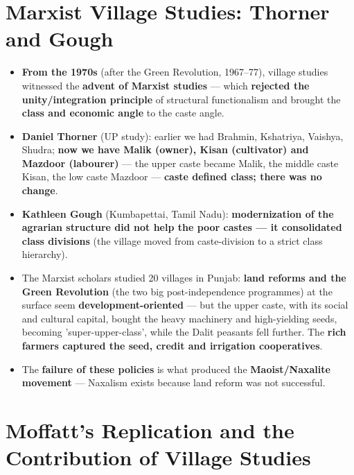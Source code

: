 \section{Marxist Village Studies: Thorner and Gough}

\begin{KeyConcept}
\begin{itemize}
\item \textbf{From the 1970s} (after the Green Revolution, 1967--77), village studies witnessed the \textbf{advent of Marxist studies} --- which \textbf{rejected the unity/integration principle} of structural functionalism and brought the \textbf{class and economic angle} to the caste angle.
\item \textbf{Daniel Thorner} (UP study): earlier we had Brahmin, Kshatriya, Vaishya, Shudra; \textbf{now we have Malik (owner), Kisan (cultivator) and Mazdoor (labourer)} --- the upper caste became Malik, the middle caste Kisan, the low caste Mazdoor --- \textbf{caste defined class; there was no change}.
\item \textbf{Kathleen Gough} (Kumbapettai, Tamil Nadu): \textbf{modernization of the agrarian structure did not help the poor castes --- it consolidated class divisions} (the village moved from caste-division to a strict class hierarchy).
\end{itemize}
\end{KeyConcept}

\begin{CriticalPoint}
\begin{itemize}
\item The Marxist scholars studied 20 villages in Punjab: \textbf{land reforms and the Green Revolution} (the two big post-independence programmes) at the surface seem \textbf{development-oriented} --- but the upper caste, with its social and cultural capital, bought the heavy machinery and high-yielding seeds, becoming 'super-upper-class', while the Dalit peasants fell further. The \textbf{rich farmers captured the seed, credit and irrigation cooperatives}.
\item The \textbf{failure of these policies} is what produced the \textbf{Maoist/Naxalite movement} --- Naxalism exists because land reform was not successful.
\end{itemize}
\end{CriticalPoint}

\section{Moffatt's Replication and the Contribution of Village Studies}

